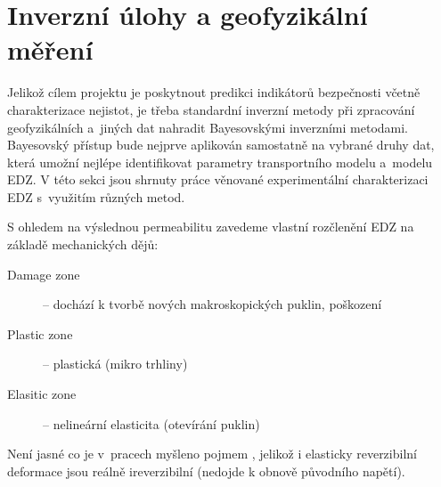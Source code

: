 \documentclass{article}
\begin{document}
% 
% 
% 
% 
% 
% 
% 
% 


\section{Inverzní úlohy a geofyzikální měření}
\label{sec:inverse_problems}

Jelikož cílem projektu je poskytnout predikci indikátorů bezpečnosti 
včetně charakterizace nejistot, je třeba standardní inverzní metody při zpracování geofyzikálních a~jiných dat nahradit Bayesovskými inverzními metodami. Bayesovský přístup bude nejprve aplikován samostatně na vybrané druhy dat, která umožní nejlépe identifikovat parametry transportního modelu a~modelu EDZ. V této sekci jsou shrnuty práce věnované experimentální charakterizaci EDZ s~využitím různých metod.

S ohledem na výslednou permeabilitu zavedeme vlastní rozčlenění EDZ na základě mechanických dějů:
\begin{description}
    \item [Damage zone] -- dochází k tvorbě nových makroskopických puklin, poškození
    \item [Plastic zone] -- plastická (mikro trhliny)
    \item [Elasitic zone] -- nelineární elasticita (otevírání puklin)
\end{description}
Není jasné co je v~pracech myšleno pojmem , jelikož i elasticky reverzibilní deformace jsou reálně ireverzibilní (nedojde k obnově původního napětí).
\end{document}
